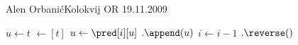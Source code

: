 \begin{naloga}{Alen Orbanić}{Kolokvij OR 19.11.2009}
\begin{odgovor}
\begin{small}
    \end{small}
        \begin{small}
        \begin{algorithmic}
            \State $u \gets t$
             $\gets [t]$
                \State $u \gets \pred[i][u]$
                $.\append(u)$
                \State $i \gets i - 1$
            \EndWhile
            $.\reverse()$
            \State {}
        \EndFunction
    \end{algorithmic}
    \end{small}
    \end{odgovor}
    \end{naloga}